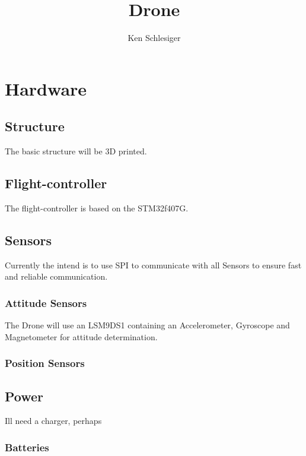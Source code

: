\documentclass[10pt,a4paper]{article}
\title {Drone}
\author {Ken Schlesiger}
\begin{document}
\maketitle
\newpage
\section*{Hardware}
\label{sec:hardware}

\subsection*{Structure}
\label{structure}
The basic structure will be 3D printed. %

\subsection*{Flight-controller}
The flight-controller is based on the STM32f407G. 

\subsection*{Sensors}
Currently the intend is to use SPI to communicate with all Sensors to ensure fast and reliable communication.

\subsubsection*{Attitude Sensors}
The Drone will use an LSM9DS1 containing an Accelerometer, Gyroscope and Magnetometer for attitude determination.

\subsubsection*{Position Sensors}

\subsection*{Power}
\label{sec:power}

Ill need a charger, perhaps

\subsubsection*{Batteries}
\end{document}
